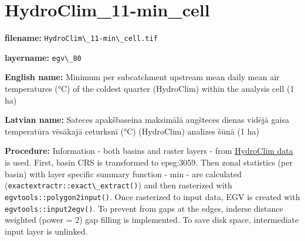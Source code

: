 \documentclass[
]{book}
\newcommand{\passthrough}[1]{#1}
\begin{document}
\section{HydroClim\_11-min\_cell}\label{ch06.080}

\textbf{filename:} \passthrough{\lstinline!HydroClim\_11-min\_cell.tif!}

\textbf{layername:} \passthrough{\lstinline!egv\_80!}

\textbf{English name:} Minimum per subcatchment upstream mean daily mean air temperatures (°C) of the coldest quarter (HydroClim) within the analysis cell (1 ha)

\textbf{Latvian name:} Sateces apakšbaseina maksimālā augšteces dienas vidējā gaisa temperatūra vēsākajā ceturksnī (°C) (HydroClim) analīzes šūnā (1 ha)

\textbf{Procedure:} Information - both basins and raster layers - from \hyperref[Ch04.12]{HydroClim data}
is used. First, basin CRS is transformed to epsg:3059. Then zonal statistics (per basin) with
layer specific summary function - min - are calculated (\passthrough{\lstinline!exactextractr::exact\_extract()!})
and then rasterized with \passthrough{\lstinline!egvtools::polygon2input()!}. Once rasterized to input data,
EGV is created with \passthrough{\lstinline!egvtools::input2egv()!}. To prevent from gaps at the edges,
inderse distance weighted (power = 2) gap filling is implemented. To save disk space,
intermediate input layer is unlinked.
\end{document}

